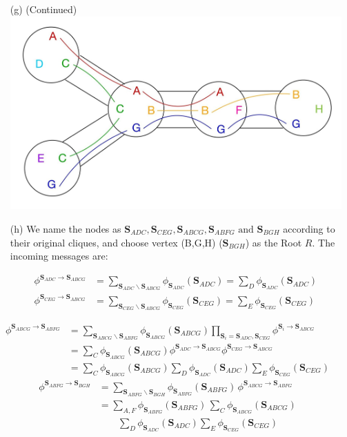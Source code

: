\documentclass[11pt]{article}
\renewcommand{\vec}[1]{\mathbf{#1}}
\begin{document}
\begin{answertext}{23cm}{}

\begin{itemize}
\item[(g)] (Continued)\\
\includegraphics[scale=0.23]{tree}
\item[(h)] We name the nodes as $\vec{S}_{ADC},\vec{S}_{CEG},\vec{S}_{ABCG},\vec{S}_{ABFG}\text{ and }\vec{S}_{BGH}$ according to their original cliques, and choose vertex (B,G,H) ($\vec{S}_{BGH}$) as the Root $R$. The incoming messages are:

\begin{align*}
\phi^{\vec{S}_{ADC}\to\vec{S}_{ABCG}}&=\sum_{\vec{S}_{ADC}\backslash \vec{S}_{ABCG}}\phi_{\vec{S}_{ADC}}(\vec{S}_{ADC}) = \sum_{D}\phi_{\vec{S}_{ADC}}(\vec{S}_{ADC})\\
\phi^{\vec{S}_{CEG}\to\vec{S}_{ABCG}}&=\sum_{\vec{S}_{CEG}\backslash \vec{S}_{ABCG}}\phi_{\vec{S}_{CEG}}(\vec{S}_{CEG}) = \sum_{E}\phi_{\vec{S}_{CEG}}(\vec{S}_{CEG})
\end{align*}
\end{itemize}
\begin{align*}
\phi^{\vec{S}_{ABCG}\to\vec{S}_{ABFG}}&=\sum_{\vec{S}_{ABCG}\backslash \vec{S}_{ABFG}}\phi_{\vec{S}_{ABCG}}(\vec{S}_{ABCG})\prod_{\vec{S}_i=\vec{S}_{ADC},\vec{S}_{CEG}}\phi^{\vec{S}_i\to\vec{S}_{ABCG}}\\
&= \sum_{C}\phi_{\vec{S}_{ABCG}}(\vec{S}_{ABCG})\phi^{\vec{S}_{ADC}\to\vec{S}_{ABCG}}\phi^{\vec{S}_{CEG}\to\vec{S}_{ABCG}}\\
&= \sum_{C}\phi_{\vec{S}_{ABCG}}(\vec{S}_{ABCG})\sum_{D}\phi_{\vec{S}_{ADC}}(\vec{S}_{ADC})\sum_{E}\phi_{\vec{S}_{CEG}}(\vec{S}_{CEG})
\end{align*}
\begin{align*}
\phi^{\vec{S}_{ABFG}\to\vec{S}_{BGH}} &= \sum_{\vec{S}_{ABFG}\backslash\vec{S}_{BGH}} \phi_{\vec{S}_{ABFG}}(\vec{S}_{ABFG}) \,\phi^{\vec{S}_{ABCG}\to\vec{S}_{ABFG}} \\
&= \sum_{A,F} \phi_{\vec{S}_{ABFG}}(\vec{S}_{ABFG}) \,\sum_{C}\phi_{\vec{S}_{ABCG}}(\vec{S}_{ABCG})\\
&\qquad\sum_{D}\phi_{\vec{S}_{ADC}}(\vec{S}_{ADC})\sum_{E}\phi_{\vec{S}_{CEG}}(\vec{S}_{CEG})
\end{align*}

\end{answertext}
\end{document}

